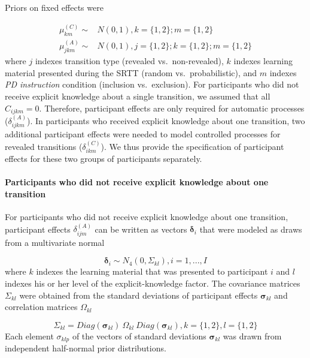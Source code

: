 \documentclass[english,,man]{apa6}
\begin{document}
\begin{appendix}
Priors on fixed effects were

\[
\begin{aligned}
\mu_{km}^{(C)} \sim & N(0, 1), k = \lbrace 1, 2 \rbrace; m = \lbrace 1, 2 \rbrace\\
\mu_{jkm}^{(A)} \sim & N(0, 1), j = \lbrace 1, 2 \rbrace; k = \lbrace 1, 2 \rbrace; m = \lbrace 1, 2 \rbrace
\end{aligned}
\] where \(j\) indexes transition type (revealed vs.~non-revealed),
\(k\) indexes learning material presented during the SRTT (random
vs.~probabilistic), and \(m\) indexes \emph{PD instruction} condition
(inclusion vs.~exclusion). For participants who did not receive explicit
knowledge about a single transition, we assumed that all
\(C_{ijkm} = 0\). Therefore, participant effects are only required for
automatic processes (\(\delta_{ijkm}^{(A)}\)). In participants who
received explicit knowledge about one transition, two additional
participant effects were needed to model controlled processes for
revealed transitions (\(\delta_{ikm}^{(C)}\)). We thus provide the
specification of participant effects for these two groups of
participants separately.

\hypertarget{participants-who-did-not-receive-explicit-knowledge-about-one-transition}{%
\paragraph{Participants who did not receive explicit knowledge about one
transition}\label{participants-who-did-not-receive-explicit-knowledge-about-one-transition}}

For participants who did not receive explicit knowledge about one
transition, participant effects \(\delta_{ijm}^{(A)}\) can be written as
vectors \(\boldsymbol{\delta}_i\) that were modeled as draws from a
multivariate normal

\[
\boldsymbol{\delta}_i \sim N_4 (0, \Sigma_{kl}), i = 1, ..., I
\] where \(k\) indexes the learning material that was presented to
participant \(i\) and \(l\) indexes his or her level of the
explicit-knowledge factor. The covariance matrices \(\Sigma_{kl}\) were
obtained from the standard deviations of participant effects
\(\boldsymbol{\sigma}_{kl}\) and correlation matrices \(\Omega_{kl}\)

\[
\Sigma_{kl} = Diag(\boldsymbol{\sigma}_{kl})~\Omega_{kl}~Diag(\boldsymbol{\sigma}_{kl}), k = \lbrace 1, 2 \rbrace, l = \lbrace 1, 2 \rbrace
\] Each element \(\sigma_{klp}\) of the vectors of standard deviations
\(\boldsymbol{\sigma}_{kl}\) was drawn from independent half-normal
prior distributions.


\end{appendix}
\end{document}
